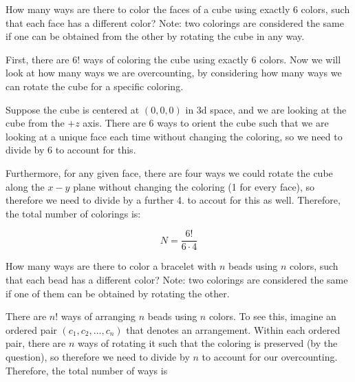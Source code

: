 \documentclass[11pt]{article}
\begin{document}
\begin{Parts}

    \Part How many ways are there to color the faces of a cube using exactly $6$ colors, such that each face has a different color? Note: two colorings are considered the same if one can be obtained from the other by rotating the cube in any way.

    \begin{solution}
      First, there are 6! ways of coloring the cube using exactly 6 colors. Now we will look at how many ways we are overcounting, by considering how many ways we can rotate the cube for a specific coloring. 

      Suppose the cube is centered at $(0, 0, 0)$ in 3d space, and we are looking at the cube from the $+z$ axis. There are 6 ways to orient the cube such that we are looking at a unique face each time without changing the coloring, so we need to divide by 6 to account for this. 

      Furthermore, for any given face, there are four ways we could rotate the cube along the $x-y$ plane without changing the coloring (1 for every face), so therefore we need to divide by a further 4. to accout for this as well. Therefore, the total number of colorings is:

      \[ N = \frac{6!}{6 \cdot 4}\]
    \end{solution}
    

    \Part How many ways are there to color a bracelet with $n$ beads using $n$ colors, such that each bead has a different color? Note: two colorings are considered the same if one of them can be obtained by rotating the other.

    \begin{solution}
      There are $n!$ ways of arranging $n$ beads using $n$ colors. To see this, imagine an ordered pair $(c_1, c_2, \dots, c_n)$ that denotes an arrangement. Within each ordered pair, there are $n$ ways of rotating it such that the coloring is preserved (by the question), so therefore we need to divide by $n$ to account for our overcounting. Therefore, the total number of ways is


\end{solution}
\end{Parts}
\end{document}
